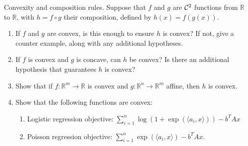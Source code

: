 \documentclass[10pt]{article}
\begin{document}
\begin{problem}[Problem 2]
Convexity and composition rules. Suppose that \( f \) and \( g \) are \( \mathcal{C}^2 \) functions from \( \mathbb{R} \) to \( \mathbb{R} \), with \( h = f\circ g \) their composition, defined by 
\(
h(x) = f(g(x)).
\) 
\begin{enumerate}[label=(\alph*)]
\item If \( f \) and \( g \) are convex, is this enough to ensure \( h \) is convex? If not, give a counter example, along with any additional hypotheses.  
\item If \( f \) is convex and \( g \) is concave, can \( h \) be convex? Is there an additional hypothesis that guarantees \( h \) is convex? 
\item Show that if \( f: \mathbb{R}^m \rightarrow \mathbb{R} \) is convex and \( g: \mathbb{R}^n \rightarrow \mathbb{R}^m \) affine, then \( h \) is convex. 
\item Show that the following functions are convex: 
\begin{enumerate}[label=(\roman*)]
\item Logistic regression objective: \( \sum_{i=1}^n \log(1+\exp(\langle a_i, x\rangle))- b^TAx \)
\item Poisson regression objective: \( \sum_{i=1}^n \exp(\langle a_i, x \rangle) - b^TAx \). 
\end{enumerate}
\end{enumerate}
\end{problem}
\end{document}
